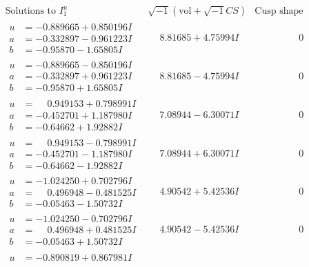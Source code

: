 \documentclass[1p]{elsarticle_modified}
\theoremstyle{definition}
\newcommand{\I}{\sqrt{-1}}
\begin{document}
$$\begin{array}{c|c|c}
\text{Solutions to }I^u_{1}& \I (\text{vol} + \sqrt{-1}CS) & \text{Cusp shape}\\
 \hline 
\begin{aligned}
u &= -0.889665 + 0.850196 I \\
a &= -0.332897 - 0.961223 I \\
b &= -0.95870 - 1.65805 I\end{aligned}
 & \phantom{-}8.81685 + 4.75994 I & \phantom{-0.000000 } 0 \\ \hline\begin{aligned}
u &= -0.889665 - 0.850196 I \\
a &= -0.332897 + 0.961223 I \\
b &= -0.95870 + 1.65805 I\end{aligned}
 & \phantom{-}8.81685 - 4.75994 I & \phantom{-0.000000 } 0 \\ \hline\begin{aligned}
u &= \phantom{-}0.949153 + 0.798991 I \\
a &= -0.452701 + 1.187980 I \\
b &= -0.64662 + 1.92882 I\end{aligned}
 & \phantom{-}7.08944 - 6.30071 I & \phantom{-0.000000 } 0 \\ \hline\begin{aligned}
u &= \phantom{-}0.949153 - 0.798991 I \\
a &= -0.452701 - 1.187980 I \\
b &= -0.64662 - 1.92882 I\end{aligned}
 & \phantom{-}7.08944 + 6.30071 I & \phantom{-0.000000 } 0 \\ \hline\begin{aligned}
u &= -1.024250 + 0.702796 I \\
a &= \phantom{-}0.496948 - 0.481525 I \\
b &= -0.05463 - 1.50732 I\end{aligned}
 & \phantom{-}4.90542 + 5.42536 I & \phantom{-0.000000 } 0 \\ \hline\begin{aligned}
u &= -1.024250 - 0.702796 I \\
a &= \phantom{-}0.496948 + 0.481525 I \\
b &= -0.05463 + 1.50732 I\end{aligned}
 & \phantom{-}4.90542 - 5.42536 I & \phantom{-0.000000 } 0 \\ \hline\begin{aligned}
u &= -0.890819 + 0.867981 I \\

\end{aligned}
\end{array}$$
\end{document}
